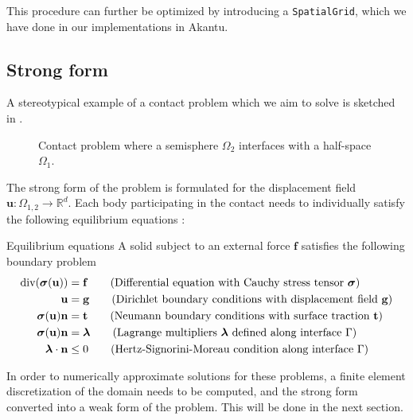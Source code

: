 \documentclass[11pt, a4paper]{article}
\begin{document}
This procedure can further be optimized by introducing a \texttt{SpatialGrid}, which we have done in our implementations in Akantu.

\subsection{Strong form}
\label{subsec:strong}

A stereotypical example of a contact problem which we aim to solve is sketched in .

\begin{figure}[H]
    \centering
    
    \caption{Contact problem where a semisphere $\Omega_2$ interfaces with a half-space $\Omega_1$.}\label{fig:contactproblem}
\end{figure}

The strong form of the problem is formulated for the displacement field 
$\mathbf{u}: \Omega_{1, 2} \to \mathbb{R}^d$. Each body participating in the contact needs to individually satisfy the following equilibrium equations \cite{voet}:

\begin{block}{Equilibrium equations}
A solid subject to an external force $\mathbf{f}$ satisfies the following boundary problem
\begin{align}
     \text{div}(\boldsymbol{\sigma}(\mathbf{u})) &= \mathbf{f} \label{con:stress-tensor} \tag{Differential equation with Cauchy stress tensor $\boldsymbol{\sigma}$} \\
    \mathbf{u} &= \mathbf{g} \label{con:dirichlet}  \tag{Dirichlet boundary conditions with displacement field $\mathbf{g}$}  \\
    \boldsymbol{\sigma}(\mathbf{u}) \mathbf{n} &= \mathbf{t} \label{con:neumann}  \tag{Neumann boundary conditions with surface traction $\mathbf{t}$}  \\
    \boldsymbol{\sigma}(\mathbf{u}) \mathbf{n} &= \boldsymbol{\lambda} \label{con:lagrange}  \tag{Lagrange multipliers $\boldsymbol{\lambda}$ defined along interface $\Gamma$}  \\
    \boldsymbol{\lambda} \cdot \mathbf{n} &\leq 0 \label{con:hertz} \tag{Hertz-Signorini-Moreau condition along interface $\Gamma$}
\end{align}
\end{block}

In order to numerically approximate solutions for these problems, a finite element discretization of the domain needs to be computed, and the strong form converted into a weak form of the problem. This will be done in the next section.
\end{document}
